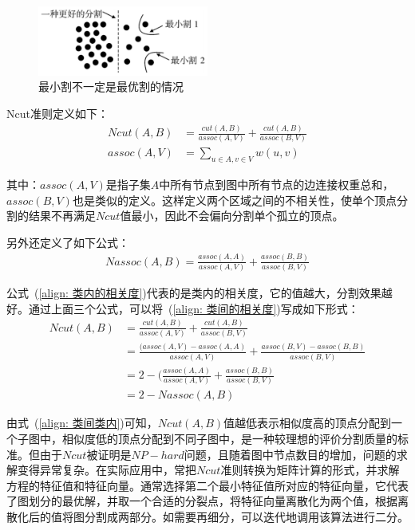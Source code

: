 \documentclass[12pt]{article}
\begin{document}
\begin{figure}[!ht]
\centering
\includegraphics[width=0.5\textwidth]{minCuts.png}
\caption{最小割不一定是最优割的情况}
\label{fig: minCuts}
\end{figure} 

Ncut准则定义如下：
\begin{align}
\label{align: 类间的相关度}
Ncut(A, B) & = \frac{cut(A, B)}{assoc(A, V)} + \frac{cut(A, B)}{assoc(B, V)}\\
assoc(A, V) & = \sum_{u \in A, v \in V} w(u, v)
\end{align}

其中：$assoc(A, V)$是指子集$A$中所有节点到图中所有节点的边连接权重总和，$assoc(B, V)$也是类似的定义。这样定义两个区域之间的不相关性，使单个顶点分割的结果不再满足$Ncut$值最小，因此不会偏向分割单个孤立的顶点。

另外还定义了如下公式：
\begin{align}
\label{align: 类内的相关度}
Nassoc(A, B) = \frac{assoc(A, A)}{assoc(A, V)} + \frac{assoc(B, B)}{assoc(B, V)}
\end{align}

公式~(\ref{align: 类内的相关度})代表的是类内的相关度，它的值越大，分割效果越好。通过上面三个公式，可以将~(\ref{align: 类间的相关度})写成如下形式：
\begin{align}
\label{align: 类间类内}
Ncut(A, B) & = \frac{cut(A, B)}{assoc(A, V)} + \frac{cut(A, B)}{assoc(B, V)} \nonumber \\
          & = \frac{(assoc(A, V)-assoc(A, A)}{assoc(A, V)}+\frac{assoc(B, V)-assoc(B, B)}{assoc(B, V)} \nonumber \\
          & = 2 - (\frac{assoc(A, A)}{assoc(A, V)}+\frac{assoc(B, B)}{assoc(B,V)} \nonumber \\
          & = 2-Nassoc(A, B)
\end{align}

由式~(\ref{align: 类间类内})可知，$Ncut(A, B)$值越低表示相似度高的顶点分配到一个子图中，相似度低的顶点分配到不同子图中，是一种较理想的评价分割质量的标准。但由于$Ncut$被证明是$NP-hard$问题，且随着图中节点数目的增加，问题的求解变得异常复杂。在实际应用中，常把$Ncut$准则转换为矩阵计算的形式，并求解方程的特征值和特征向量。通常选择第二个最小特征值所对应的特征向量，它代表了图划分的最优解，并取一个合适的分裂点，将特征向量离散化为两个值，根据离散化后的值将图分割成两部分。如需要再细分，可以迭代地调用该算法进行二分。
\end{document}
